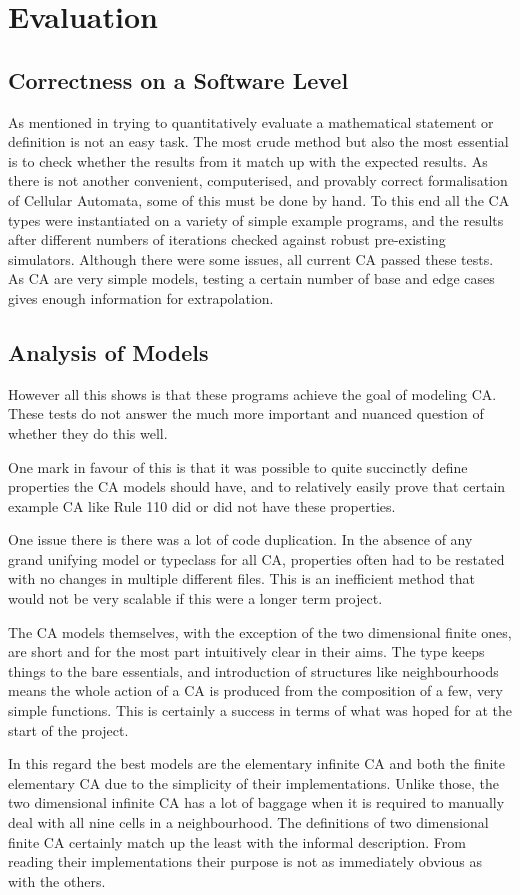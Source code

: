 \chapter{Evaluation}

\section{Correctness on a Software Level}

As mentioned in  trying to quantitatively evaluate a mathematical statement or definition is not an easy task.
The most crude method but also the most essential is to check whether the results from it match up with the expected results.
As there is not another convenient, computerised, and provably correct formalisation of Cellular Automata,
some of this must be done by hand.
To this end all the CA types were instantiated on a variety of simple example programs, 
and the results after different numbers of iterations checked against robust pre-existing simulators.
Although there were some issues, 
all current CA passed these tests.
As CA are very simple models,
testing a certain number of base and edge cases gives enough information for extrapolation.


\section{Analysis of Models}
However all this shows is that these programs achieve the goal of modeling CA.
These tests do not answer the much more important and nuanced question of whether they do this well.

One mark in favour of this is that it was possible to quite succinctly define properties the CA models should have,
and to relatively easily prove that certain example CA like Rule 110 did or did not have these properties.

One issue there is there was a lot of code duplication.
In the absence of any grand unifying model or typeclass for all CA,
properties often had to be restated with no changes in multiple different files.
This is an inefficient method that would not be very scalable if this were a longer term project.

The CA models themselves,
with the exception of the two dimensional finite ones,
are short and for the most part intuitively clear in their aims.
The type keeps things to the bare essentials,
and introduction of structures like neighbourhoods means the whole action of a CA is produced from the composition of a few, very simple functions.
This is certainly a success in terms of what was hoped for at the start of the project.

In this regard the best models are the elementary infinite CA
and both the finite elementary CA due to the simplicity of their implementations.
Unlike those, the two dimensional infinite CA has a lot of baggage when it is required to manually deal with all nine cells in a neighbourhood.
The definitions of two dimensional finite CA certainly match up the least with the informal description.
From reading their implementations their purpose is not as immediately obvious as with the others.
